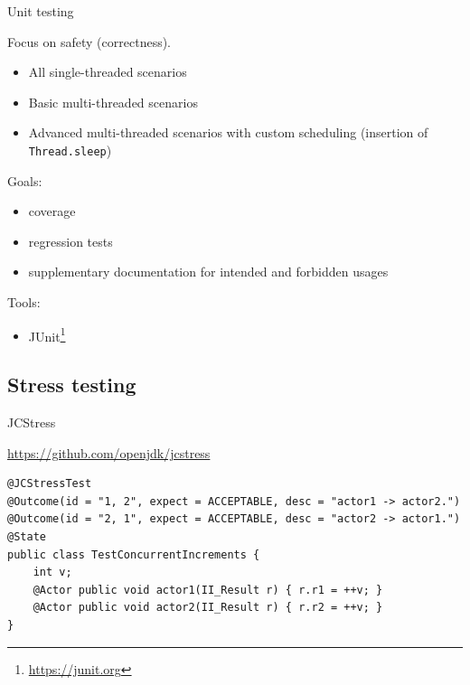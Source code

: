 \begin{frame}{Unit testing}

Focus on safety (correctness).

\pause

\begin{itemize}
  \item All single-threaded scenarios
  \item Basic multi-threaded scenarios
  \item Advanced multi-threaded scenarios with custom scheduling (insertion of \texttt{Thread.sleep})
\end{itemize}

\pause
Goals:
\begin{itemize}
  \item coverage
  \item regression tests
  \item supplementary documentation for intended and forbidden usages
\end{itemize}

\pause
Tools:
\begin{itemize}
  \item JUnit\footnote<4->{\tiny\url{https://junit.org}} 
\end{itemize}

\end{frame}


\subsection{Stress testing}
\showTOCSub

\begin{frame}[t,fragile]{JCStress}

{\small\url{https://github.com/openjdk/jcstress}}

\begin{verbatim}
@JCStressTest
@Outcome(id = "1, 2", expect = ACCEPTABLE, desc = "actor1 -> actor2.")
@Outcome(id = "2, 1", expect = ACCEPTABLE, desc = "actor2 -> actor1.")
@State
public class TestConcurrentIncrements {
    int v;
    @Actor public void actor1(II_Result r) { r.r1 = ++v; }
    @Actor public void actor2(II_Result r) { r.r2 = ++v; }
}
\end{verbatim}
\end{frame}

